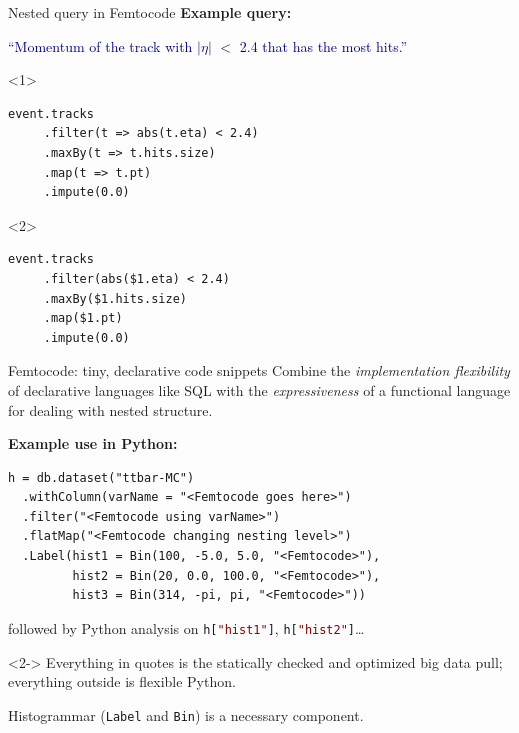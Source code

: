 \documentclass{beamer}
\begin{document}
\begin{frame}[fragile]{Nested query in Femtocode}
\vspace{0.5 cm}
{\bf Example query:}
\begin{center}
\begin{minipage}{0.95\linewidth}
\textcolor{darkblue}{``Momentum of the track with $|\eta|$ $<$ 2.4 that has the most hits.''}
\end{minipage}
\end{center}
\small
\begin{onlyenv}<1>
\begin{verbatim}
event.tracks
     .filter(t => abs(t.eta) < 2.4)
     .maxBy(t => t.hits.size)
     .map(t => t.pt)
     .impute(0.0)
\end{verbatim}
\end{onlyenv}
\begin{onlyenv}<2>
\begin{verbatim}
event.tracks
     .filter(abs($1.eta) < 2.4)
     .maxBy($1.hits.size)
     .map($1.pt)
     .impute(0.0)
\end{verbatim}
\end{onlyenv}
\end{frame}

\begin{frame}[fragile]{Femtocode: tiny, declarative code snippets}
\vspace{0.4 cm}
Combine the {\it implementation flexibility} of declarative languages like SQL with the {\it expressiveness} of a functional language for dealing with nested structure.

\vspace{0.5 cm}
{\bf Example use in Python:}

\small
\begin{verbatim}
h = db.dataset("ttbar-MC")
  .withColumn(varName = "<Femtocode goes here>")
  .filter("<Femtocode using varName>")
  .flatMap("<Femtocode changing nesting level>")
  .Label(hist1 = Bin(100, -5.0, 5.0, "<Femtocode>"),
         hist2 = Bin(20, 0.0, 100.0, "<Femtocode>"),
         hist3 = Bin(314, -pi, pi, "<Femtocode>"))
\end{verbatim}

\normalsize
followed by Python analysis on {\small\tt h[\textcolor{darkred}{"hist1"}]}, {\small\tt h[\textcolor{darkred}{"hist2"}]}\ldots

\vspace{0.1 cm}
\begin{uncoverenv}<2->
Everything in quotes is the statically checked and optimized big data pull; everything outside is flexible Python.

\vspace{0.1 cm}
Histogrammar ({\tt\small Label} and {\tt\small Bin}) is a necessary component.
\end{uncoverenv}
\end{frame}
\end{document}
